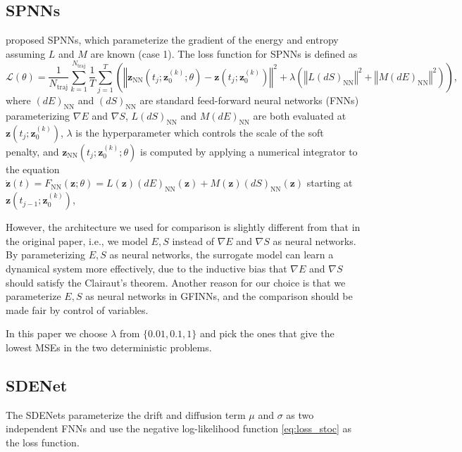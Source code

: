 \documentclass[openacc]{rsproca_new}%
\newcommand{\z}{\bm{z}}
\begin{document}
\subsection{SPNNs}
\cite{hernandez2021structure}
proposed SPNNs,
which parameterize the gradient of the energy and entropy
assuming $L$ and $M$ are known (case 1).
The loss function for SPNNs 
is defined as
\begin{equation*}
    \mathcal{L}(\theta) = \frac{1}{N_{\text{traj}}} \sum_{k=1}^{N_{\text{traj}}} \frac{1}{T} \sum_{j=1}^{T} 
    \left(\left\Vert\z_{\text{NN}}(t_j;\z_0^{(k)};\theta) - \z(t_j;\z_0^{(k)}) \right\Vert^2 + \lambda\left( \left\Vert L(dS)_{\text{NN}}\right\Vert^2 + \left\Vert M(dE)_{\text{NN}}\right\Vert^2\right)\right),
\end{equation*}
where 
$(dE)_{\text{NN}}$ and $(dS)_{\text{NN}}$ are standard feed-forward neural networks (FNNs) parameterizing $\nabla E$ and $\nabla S$,
$L(dS)_{\text{NN}}$ and $M(dE)_{\text{NN}}$ are both evaluated at $\z(t_j;\z_0^{(k)})$, $\lambda$ is the hyperparameter which controls the scale of the soft penalty,
and 
$\z_{\text{NN}}(t_j;\z_0^{(k)};\theta)$ is computed by applying
a numerical integrator to the equation $\dot{\z}(t) = F_{\text{NN}}(\z;\theta) = L(\z) (dE)_{\text{NN}}(\z) + M(\z) (dS)_{\text{NN}}(\z)$
starting at $\z(t_{j-1};\z_0^{(k)})$, 

However, the architecture we used for comparison is slightly different from that in the original paper, i.e., we model $E,S$ instead of $\nabla E$ and $\nabla S$ as neural networks. By parameterizing $E,S$ as neural networks, the surrogate model can learn a dynamical system more effectively, due to the inductive bias that $\nabla E$ and $\nabla S$ should satisfy the Clairaut's theorem. Another reason for our choice is that we parameterize $E,S$ as neural networks in GFINNs, and the comparison should be made fair by control of variables.

In this paper we choose $\lambda$ from $\{0.01,0.1,1\}$ and pick the ones that give the lowest MSEs in the two deterministic problems.
\subsection{SDENet}
The SDENets parameterize the drift and diffusion term $\mu$ and $\sigma$ as two independent FNNs and use the negative log-likelihood function \eqref{eq:loss_stoc} as the loss function.  
\end{document}

